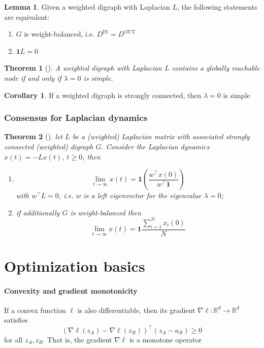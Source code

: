 \documentclass{book}
\newcommand{\R}{\mathbb{R}}
\theoremstyle{theoremv2}
\newtheorem{theorem}{Theorem}[chapter]
\theoremstyle{defv2}
\theoremstyle{remark}
\theoremstyle{remark}
\theoremstyle{definition}
\newtheorem*{lemma}{Lemma}
\theoremstyle{definition}
\newtheorem*{corollary}{Corollary}
\begin{document}
\begin{lemma}
    Given a weighted digraph with Laplacian $L$, the following statements are equivalent: 
    \begin{enumerate}
        \item $G$ is weight-balanced, i.e. $D^{\text{IN}} = D^{\text{OUT}}$
        \item $\mathbf{1}L = 0$
    \end{enumerate}
\end{lemma}
\begin{theorem}[]
    A weighted digraph with Laplacian $L$ contains a globally reachable node if and only if $\lambda=0$ is simple.
\end{theorem}
\begin{corollary}
    If a weighted digraph is strongly connected, then $\lambda=0$ is simple
\end{corollary}

\subsection{Consensus for Laplacian dynamics}
\begin{theorem}[]
    let $L$ be a (weighted) Laplacian matrix with associated strongly connected (weighted) digraph $G$. Consider the Laplacian dynamics $\dot{x}(t) = -Lx(t),\  t\geq0$, then
    \begin{enumerate}
        \item \[
                \lim_{t\to\infty} x(t) = \mathbf{1}\left(\displaystyle\frac{w^\top x(0)}{w^\top\mathbf{1}}\right)
        \]
            with $w^\top L = 0$, i.e. $w$ is a left eigenvector for the eigenvalue $\lambda=0$;
        \item if additionally $G$ is weight-balanced then 
            \[
                \lim_{t\to\infty}x(t) = \mathbf{1} \displaystyle\frac{\sum_{i=1}^{N}x_i(0)}{N}
            \]
    \end{enumerate}
\end{theorem}

\chapter{Optimization basics}
\subsubsection{Convexity and gradient monotonicity}
If a convex function $\ell$ is also differentiable, then its gradient $\nabla\ell: \R^d\to\R^d$ satisfies 
\[
    \left(\nabla\ell(z_A)-\nabla\ell(z_B)\right)^\top(z_A-a_B)\geq 0
\]
for all $z_A,z_B$. That is, the gradient $\nabla\ell$ is a monotone operator
\end{document}
